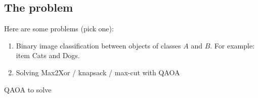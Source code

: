 \subsection{The problem}
Here are some problems (pick one):
\begin{enumerate}
    \item Binary image classification between objects of classes $A$ and $B$. For example: item Cats and Dogs.
    \item Solving Max2Xor / knapsack / max-cut with QAOA
\end{enumerate}




QAOA to solve 